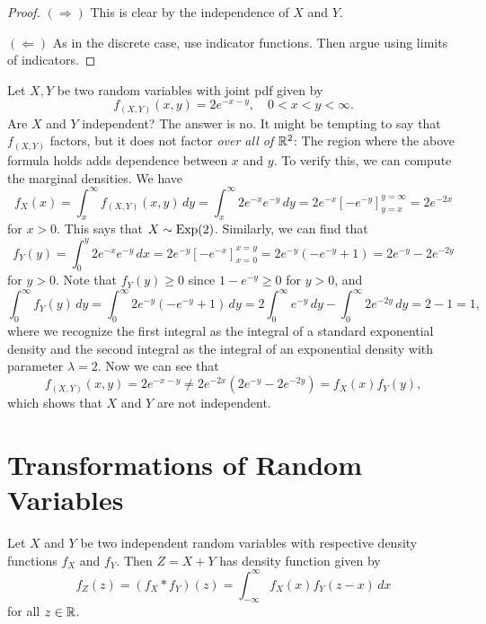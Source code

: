 \begin{proof}
  $(\Rightarrow)$ This is clear by the independence
  of $X$ and $Y$.

  $(\Leftarrow)$ As in the discrete case, use
  indicator functions. Then argue using limits
  of indicators.
\end{proof}

\begin{example}
  Let $X, Y$ be two random variables with joint pdf
  given by
  \[
    f_{(X, Y)}(x, y) = 2e^{-x - y},
    \quad 0 < x < y < \infty.
  \]
  Are $X$ and $Y$ independent? The answer is no.
  It might be tempting to say that $f_{(X, Y)}$
  factors, but it does not factor \emph{over all of $\mathbb{R}^2$}:
  The region where the above formula
  holds adds dependence between $x$ and $y$. To
  verify this, we can compute the marginal densities.
  We have
  \[
    f_X(x)
    = \int_x^\infty f_{(X, Y)}(x, y) \, dy
    = \int_x^\infty 2e^{-x} e^{-y} \, dy
    = 2e^{-x} \left[-e^{-y}\right]_{y = x}^{y = \infty}
    = 2e^{-2x}
  \]
  for $x > 0$. This says that
  $X \sim \operatorname{Exp}(2)$. Similarly, we can find that
  \[
    f_Y(y)
    = \int_0^y 2e^{-x} e^{-y} \, dx
    = 2e^{-y} \left[-e^{-x}\right]_{x = 0}^{x = y}
    = 2e^{-y}(-e^{-y} + 1)
    = 2e^{-y} - 2e^{-2y}
  \]
  for $y > 0$. Note that $f_Y(y) \ge 0$ since
  $1 - e^{-y} \ge 0$ for $y > 0$, and
  \[
    \int_0^\infty f_Y(y)\, dy
    = \int_0^\infty 2e^{-y}(-e^{-y} + 1) \, dy
    = 2 \int_0^\infty e^{-y} \, dy - \int_0^\infty 2e^{-2y} \, dy
    = 2 - 1 = 1,
  \]
  where we recognize the first integral as the integral
  of a standard exponential density and the second
  integral as the integral of an exponential density
  with parameter $\lambda = 2$. Now we can see that
  \[
    f_{(X, Y)}(x, y) = 2 e^{-x - y}
    \ne 2e^{-2x}(2e^{-y} - 2e^{-2y})
    = f_X(x) f_Y(y),
  \]
  which shows that $X$ and $Y$ are not independent.
\end{example}

\section{Transformations of Random Variables}
\begin{theorem}
  Let $X$ and $Y$ be two independent random variables
  with respective density functions $f_X$ and $f_Y$.
  Then $Z = X + Y$ has density function given by
  \[
    f_Z(z) = (f_X * f_Y)(z)
    = \int_{-\infty}^\infty f_X(x) f_Y(z - x) \, dx
  \]
  for all $z \in \mathbb{R}$.
\end{theorem}

